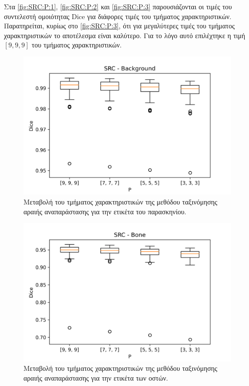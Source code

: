 \documentclass[a4paper,12pt]{article}
\begin{document}
Στα \autoref{fig:SRC:P:1}, \autoref{fig:SRC:P:2} και \autoref{fig:SRC:P:3}
παρουσιάζονται οι τιμές του συντελεστή ομοιότητας Dice για διάφορες τιμές του
τμήματος χαρακτηριστικών. Παρατηρείται, κυρίως στο \autoref{fig:SRC:P:3}, ότι
για μεγαλύτερες τιμές του τμήματος χαρακτηριστικών το αποτέλεσμα είναι καλύτερο.
Για το λόγο αυτό επιλέχτηκε η τιμή $[9,9,9]$ του τμήματος χαρακτηριστικών.

\begin{figure}[H]
    \centering
    \includegraphics[width=0.85\linewidth]{SRC_P_Background_plot.png}
    \caption{Μεταβολή του τμήματος χαρακτηριστικών της μεθόδου ταξινόμησης
             αραιής αναπαράστασης για την ετικέτα του παρασκηνίου.}
    \label{fig:SRC:P:1}
\end{figure}

\begin{figure}[H]
    \centering
    \includegraphics[width=0.85\linewidth]{SRC_P_Bone_plot.png}
    \caption{Μεταβολή του τμήματος χαρακτηριστικών της μεθόδου ταξινόμησης
             αραιής αναπαράστασης για την ετικέτα των οστών.}
    \label{fig:SRC:P:2}
\end{figure}
\end{document}

